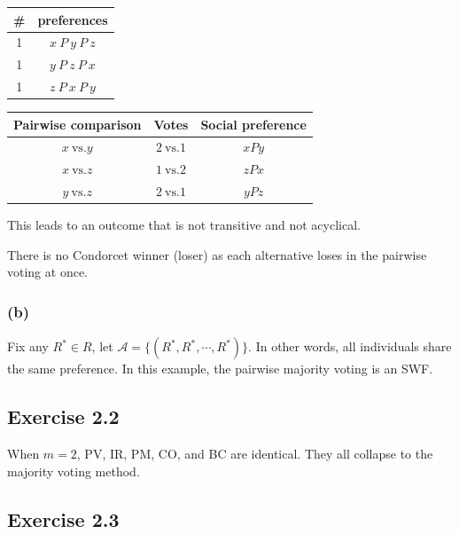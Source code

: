 \documentclass[a4paper]{article}
\begin{document}
\begin{table}[!htbp]
    \centering
    \begin{tabular}{c|c|}
        \# & preferences         \\ 
        \hline
        1  & $x\: P\: y\: P\: z$ \\
        1  & $y\: P\: z\: P\: x$ \\
        1  & $z\: P\: x\: P\: y$ \\
        \hline
    \end{tabular}
\end{table}

\begin{table}[!htbp]
    \centering
    \begin{tabular}{ccc}
        \hline
        Pairwise comparison & Votes               & Social preference  \\ 
        \hline
        $x\: \text{vs.} y$  & $2\: \text{vs.} 1$  & $xPy$              \\
        $x\: \text{vs.} z$  & $1\: \text{vs.} 2$  & $zPx$              \\
        $y\: \text{vs.} z$  & $2\: \text{vs.} 1$  & $yPz$              \\
        \hline
    \end{tabular}
\end{table}

This leads to an outcome that is not transitive and not acyclical.

There is no Condorcet winner (loser) as each alternative loses in the pairwise voting at once.

\subsubsection*{(b)}

Fix any $R^*\in R$, let $\mathscr{A}=\{(R^*, R^*,\cdots, R^*) \}$. In other words, all individuals share the same preference. In this example, the pairwise majority voting is an SWF.

\subsection*{Exercise 2.2}

When $m=2$, PV, IR, PM, CO, and BC are identical. They all collapse to the majority voting method.

\subsection*{Exercise 2.3}
\end{document}
